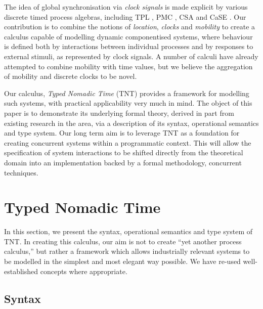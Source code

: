 \documentclass[orivec]{llncs}
\begin{document}
The idea of global synchronisation via \emph{clock signals} is made
explicit by various discrete timed process algebras, including TPL
\cite{hennessy:tpl}, PMC \cite{pmc}, CSA \cite{csa} and CaSE
\cite{case,norton05alg}. Our contribution is to combine the notions of
\emph{location}, \emph{clocks} and \emph{mobility} to create a calculus
capable of modelling dynamic componentised systems, where behaviour is
defined both by interactions between individual processes and by
responses to external stimuli, as represented by clock signals.  A
number of calculi \cite{lee:realtime,satoh:phd,webpi} have already
attempted to combine mobility with  time
values, but we believe the aggregation of mobility
and discrete clocks to be novel.

Our calculus, \emph{Typed Nomadic Time} (TNT) provides a framework for
modelling such systems, with practical
applicability very much in mind. The object of this
paper is to demonstrate its underlying formal theory, derived in part
from existing research in the area, via a description of its syntax,
operational semantics and type system. Our long term aim is to leverage
TNT as a foundation for creating concurrent systems within a
programmatic context. This will allow the specification of system interactions to be shifted directly from the
theoretical domain into an implementation backed by a formal
methodology,  concurrent
techniques.

\section{Typed Nomadic Time}
\label{tnt}

In this section, we present the syntax, operational semantics and type
system of TNT. In creating this calculus, our aim is not to create ``yet
another process calculus,'' but rather a framework which allows
industrially relevant systems to be modelled in the simplest and most
elegant way possible. We have re-used well-established concepts where
appropriate.

\subsection{Syntax}
\end{document}
